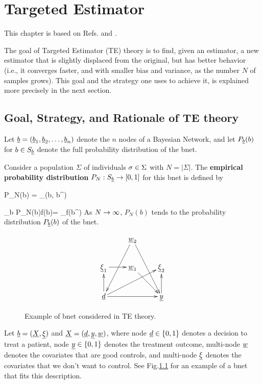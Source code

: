 \chapter{Targeted Estimator}
\label{ch-targeted-est}

\newcommand{\dpsi}[0]{\nabla\Psi}

This chapter is based on Refs.\cite{tlride} and  \cite{hoff}.

The goal of Targeted Estimator (TE) theory is
to find, given an estimator,
a new estimator that is slightly
displaced from the original,
but has better behavior (i.e.,
it converges faster, and with smaller
bias and variance, as the number $N$
of samples grows). This goal and
the strategy one uses to achieve it, is
explained more precisely in the next section.




\section{Goal, Strategy, and Rationale of TE theory}


Let ${\underline{b}} = ({\underline{b}}_1, {\underline{b}}_2, \ldots, {\underline{b}}_{n})$ denote
the $n$ nodes of a Bayesian Network, and let $P_{\underline{b}}(b)$ for $b\in S_{\underline{b}}$
denote the full probability distribution of the bnet.

 Consider a population $\Sigma$ of
 individuals $\sigma\in \Sigma$ with $N=|\Sigma|$.
 The {\bf empirical probability distribution}
 $P_N:S_{\underline{b}} \rightarrow [0,1]$ for this bnet is defined by

\beq
P_N(b) = \sum_\s\delta(b, b^\s)
\eeq

\beq
\sum_b P_N(b)f(b)=
\sum_\s f(b^\s)
\eeq
As $N\rightarrow \infty$, $P_N(b)$ tends
to the probability distribution $P_{\underline{b}}(b)$
of the bnet.
\begin{figure}[h!]
$$
\xymatrix{
&\rvw_2\ar[ddl]\ar[ddr]
\\
\ul{\xi}_1\ar[r]
&\rvw_1\ar[dr]
&\ul{\xi}_2
\\
\rvd\ar[rr]\ar[u]\ar[rru]
&
&\rvy\ar[u]
}
$$
\caption{Example of bnet considered in TE
theory.}
\label{fig-targeted-bnet}
\end{figure}

Let ${\underline{b}}=({\underline{X}}, \underline{\xi})$ and
${\underline{X}}=({\underline{d}}, {\underline{y}},{\underline{w}})$,
where
node ${\underline{d}}\in\{0,1\}$ denotes a decision to treat a patient,
node ${\underline{y}}\in \{0,1\}$ denotes the treatment outcome,
multi-node ${\underline{w}}$ denotes the covariates
that are good controls, and multi-node $\underline{\xi}$ denotes
the covariates that we don't want to control.
See Fig.\ref{fig-targeted-bnet}
for an example of a bnet that fits this description.


